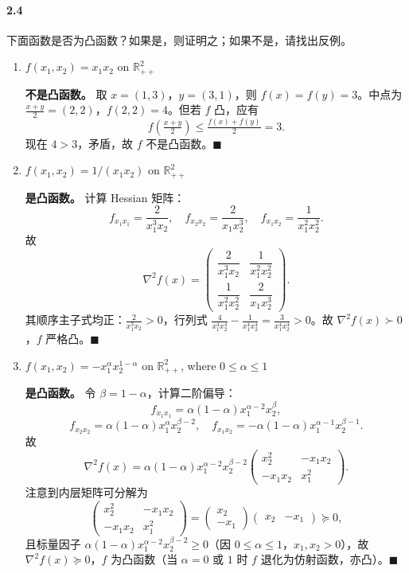 \documentclass[12pt,a4paper]{article}
\begin{document}
\paragraph{2.4}
下面函数是否为凸函数？如果是，则证明之；如果不是，请找出反例。
\begin{enumerate}
	\item $f(x_1,x_2)=x_1 x_2$ on $\mathbb{R}_{++}^2$

	\textbf{不是凸函数。} 取 $x=(1,3)$，$y=(3,1)$，则 $f(x)=f(y)=3$。中点为 $\frac{x+y}{2}=(2,2)$，$f(2,2)=4$。但若 $f$ 凸，应有
	\[
	  f\!\left(\tfrac{x+y}{2}\right) \le \tfrac{f(x)+f(y)}{2} = 3.
	\]
	现在 $4>3$，矛盾，故 $f$ 不是凸函数。$\blacksquare$

	\item $f(x_1,x_2)=1/(x_1x_2)$  on $\mathbb{R}_{++}^2$

	\textbf{是凸函数。} 计算 Hessian 矩阵：
	\[
	  f_{x_1x_1} = \frac{2}{x_1^3 x_2},\quad
	  f_{x_2x_2} = \frac{2}{x_1 x_2^3},\quad
	  f_{x_1x_2} = \frac{1}{x_1^2 x_2^2}.
	\]
	故
	\[
	  \nabla^2 f(x) = \begin{pmatrix} \dfrac{2}{x_1^3 x_2} & \dfrac{1}{x_1^2 x_2^2} \\[6pt] \dfrac{1}{x_1^2 x_2^2} & \dfrac{2}{x_1 x_2^3} \end{pmatrix}.
	\]
	其顺序主子式均正：$\frac{2}{x_1^3 x_2}>0$，行列式 $\frac{4}{x_1^4 x_2^4}-\frac{1}{x_1^4 x_2^4}=\frac{3}{x_1^4 x_2^4}>0$。故 $\nabla^2 f(x)\succ 0$，$f$ 严格凸。$\blacksquare$

	\item $f(x_1,x_2)=-x_1^\alpha x_2^{1-\alpha}$  on $\mathbb{R}_{++}^2$, where $0 \leq \alpha \leq 1$

	\textbf{是凸函数。} 令 $\beta=1-\alpha$，计算二阶偏导：
	\[
	  f_{x_1x_1} = \alpha(1-\alpha)x_1^{\alpha-2}x_2^{\beta},
	\]
	\[
	  f_{x_2x_2} = \alpha(1-\alpha)x_1^{\alpha}x_2^{\beta-2},\quad
	  f_{x_1x_2} = -\alpha(1-\alpha)x_1^{\alpha-1}x_2^{\beta-1}.
	\]
	故
	\[
	  \nabla^2 f(x) = \alpha(1-\alpha)x_1^{\alpha-2}x_2^{\beta-2}
	  \begin{pmatrix} x_2^2 & -x_1 x_2 \\ -x_1 x_2 & x_1^2 \end{pmatrix}.
	\]
	注意到内层矩阵可分解为
	\[
	  \begin{pmatrix} x_2^2 & -x_1 x_2 \\ -x_1 x_2 & x_1^2 \end{pmatrix}
	  = \begin{pmatrix} x_2 \\ -x_1 \end{pmatrix}\begin{pmatrix} x_2 & -x_1 \end{pmatrix} \succeq 0,
	\]
	且标量因子 $\alpha(1-\alpha)x_1^{\alpha-2}x_2^{\beta-2}\ge 0$（因 $0\le\alpha\le 1$，$x_1,x_2>0$），故 $\nabla^2 f(x)\succeq 0$，$f$ 为凸函数（当 $\alpha=0$ 或 $1$ 时 $f$ 退化为仿射函数，亦凸）。$\blacksquare$
\end{enumerate}
\end{document}

